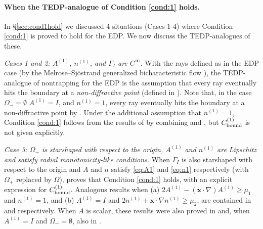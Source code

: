 \documentclass[10pt]{article}%
\numberwithin{equation}{section}
\newcommand{\bx}{\mathbf{x}}
\newcommand{\Oi}{{\Omega_-}}
\newcommand{\Oe}{{\Omega_+}}
\newcommand{\coeffAo}{A^{(1)}}
\newcommand{\coeffno}{n^{(1)}}
\begin{document}
\paragraph{When the TEDP-analogue of Condition \ref{cond:1} holds.}

In \S\ref{sec:cond1hold} we discussed 4 situations (Cases 1-4) where Condition \ref{cond:1} is proved to hold for the EDP. We now discuss the TEDP-analogues of these.

\emph{Cases 1 and 2: $\coeffAo$, $\coeffno$, and $\Gamma_I$  are $C^\infty$.} 
With the rays defined as in the EDP case (by the Melrose--Sj{\"o}strand generalized bicharacteristic flow 
\cite[\S24.3]{Ho:85}), the TEDP-analogue of nontrapping for the EDP is the assumption that 
every ray eventually hits the boundary at a \emph{non-diffractive point} (defined in \cite[Page 1037]{BaLeRa:92}). Note that, in the case $\Oi=\emptyset$ $\coeffAo= I$, and $\coeffno=1$, every ray eventually hits the boundary at a non-diffractive point by \cite[Lemma 5.3]{BaSpWu:16}.
Under the additional assumption that $\coeffno= 1$, Condition \ref{cond:1} follows from the results of \cite{BaLeRa:92} by combining \cite[Theorem 1.8]{BaSpWu:16} and \cite[Remark 5.6]{BaSpWu:16}, but $C^{(1)}_{\rm bound}$ is not given explicitly.

\emph{Case 3: $\Oi$ is starshaped with respect to the origin, $\coeffAo$ and $\coeffno$ are Lipschitz and satisfy radial monotonicity-like conditions.}
When $\Gamma_I$ is also starshaped with respect to the origin and $A$ and $n$ satisfy \eqref{eq:A1} and \eqref{eq:n1} respectively (with $\Oe$ replaced by $\Omega$), 
\cite[Theorem A.6(i)]{GrPeSp:18} proves that
Condition \ref{cond:1} holds, with an explicit expression for $C^{(1)}_{\rm bound}$. Analogous results when (a) $2\coeffAo - (\bx\cdot\nabla)\coeffAo \geq \mu_1$ and $\coeffno= 1$,
and  (b) $\coeffAo= I$ and  $2\coeffno + \bx \cdot \nabla \coeffno \geq \mu_2$, 
are contained in \cite[Theorem A.6(ii)]{GrPeSp:18} and \cite[Theorem A.6(iii)]{GrPeSp:18} respectively.
When $A$ is scalar, these results were also proved in \cite[Theorem 1]{BrGaPe:15} and, when $\coeffAo= I$ and $\Oi=\emptyset$, also in \cite[Theorem 3.2]{GrSa:18}.
\end{document}
